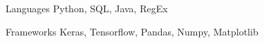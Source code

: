
\begin{cvskills}
  \cvskill
    {Languages} %
    {Python, SQL, Java, RegEx} %

  \cvskill
    {Frameworks} %
    {Keras, Tensorflow, Pandas, Numpy, Matplotlib} %
\end{cvskills}
